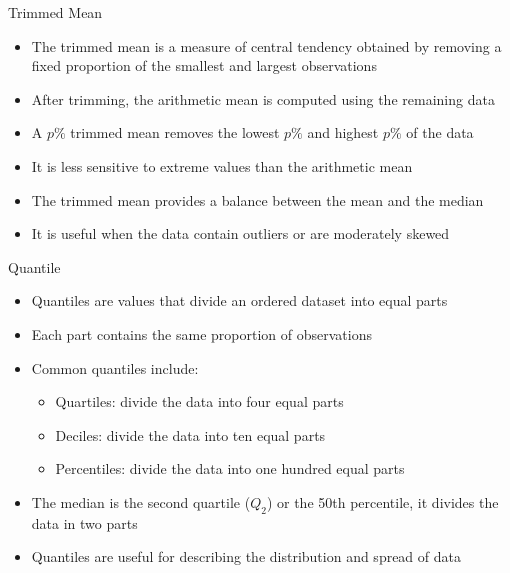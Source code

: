 \documentclass[12pt, aspectratio=169]{beamer}
\begin{document}
    \begin{frame}{Trimmed Mean}
        \begin{itemize}
            \item The trimmed mean is a measure of central tendency obtained by removing a fixed proportion of the smallest and largest observations
            \item After trimming, the arithmetic mean is computed using the remaining data
            \item A $p\%$ trimmed mean removes the lowest $p\%$ and highest $p\%$ of the data
            \item It is less sensitive to extreme values than the arithmetic mean
            \item The trimmed mean provides a balance between the mean and the median
            \item It is useful when the data contain outliers or are moderately skewed
        \end{itemize}
    \end{frame}


    \begin{frame}{Quantile}
        \begin{itemize}
            \item Quantiles are values that divide an ordered dataset into equal parts
            \item Each part contains the same proportion of observations
            \item Common quantiles include:
            \begin{itemize}
                \item Quartiles: divide the data into four equal parts
                \item Deciles: divide the data into ten equal parts
                \item Percentiles: divide the data into one hundred equal parts
            \end{itemize}
            \item The median is the second quartile ($Q_2$) or the 50th percentile, it divides the data in two parts
            \item Quantiles are useful for describing the distribution and spread of data
        \end{itemize}
    \end{frame}
\end{document}
